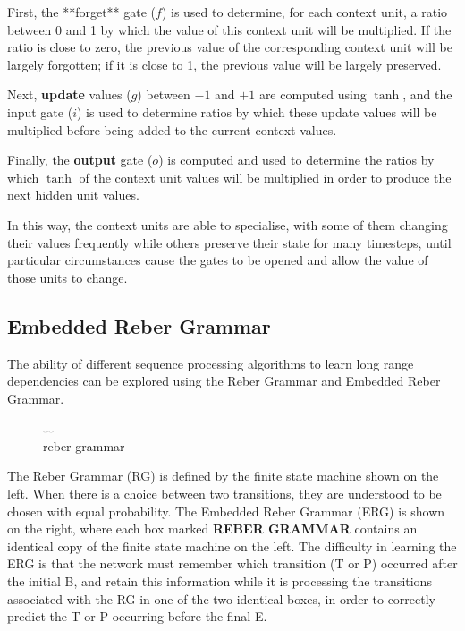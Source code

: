 \documentclass[11pt]{article}
\begin{document}
First, the **forget** gate ($f$) is used to determine, for each context unit, a ratio between 0 and 1 by which the value of this context unit will be multiplied.
If the ratio is close to zero, the previous value of the corresponding context unit will be largely forgotten;
if it is close to 1, the previous value will be largely preserved.

Next, \textbf{update} values ($g$) between $-1$ and $+1$ are computed using $\tanh$, and the input gate ($i$) is used to determine ratios by which these update values will be multiplied before being added to the current context values.

Finally, the \textbf{output} gate ($o$) is computed and used to determine the ratios by which $\tanh$ of the context unit values will be multiplied in order to produce the next hidden unit values.

In this way, the context units are able to specialise, with some of them changing their values frequently while others preserve their state for many timesteps, until particular circumstances cause the gates to be opened and allow the value of those units to change.

\subsection{Embedded Reber Grammar}\label{subsec:embedded-reber-grammar}

The ability of different sequence processing algorithms to learn long range dependencies can be explored using the Reber Grammar and Embedded Reber Grammar.
\begin{figure}[h]
    \centering
    \includegraphics[width=12,height=4]{../out/images/reber-grammar}
    \caption[reber grammar]{reber grammar}
    \label{fig: reber grammar}
\end{figure}

The Reber Grammar (RG) is defined by the finite state machine shown on the left.
When there is a choice between two transitions, they are understood to be chosen with equal probability.
The Embedded Reber Grammar (ERG) is shown on the right, where each box marked \textbf{REBER GRAMMAR} contains an identical copy of the finite state machine on the left.
The difficulty in learning the ERG is that the network must remember which transition (T or P)  occurred after the initial B, and retain this information while it is processing the transitions associated with the RG in one of the two identical boxes, in order to correctly predict the T or P occurring before the final E.
\end{document}
